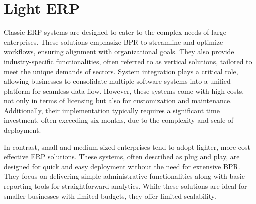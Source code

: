 \section{Light ERP}

Classic ERP systems are designed to cater to the complex needs of large enterprises.
These solutions emphasize BPR to streamline and optimize workflows, ensuring alignment with organizational goals. 
They also provide industry-specific functionalities, often referred to as vertical solutions, tailored to meet the unique demands of sectors. 
System integration plays a critical role, allowing businesses to consolidate multiple software systems into a unified platform for seamless data flow. 
However, these systems come with high costs, not only in terms of licensing but also for customization and maintenance. 
Additionally, their implementation typically requires a significant time investment, often exceeding six months, due to the complexity and scale of deployment.

In contrast, small and medium-sized enterprises tend to adopt lighter, more cost-effective ERP solutions. 
These systems, often described as plug and play, are designed for quick and easy deployment without the need for extensive BPR. 
They focus on delivering simple administrative functionalities along with basic reporting tools for straightforward analytics.
While these solutions are ideal for smaller businesses with limited budgets, they offer limited scalability. 